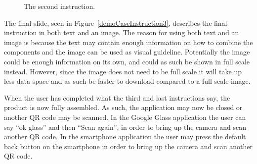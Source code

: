 	\begin{figure}[H]%
		\centering
		\qquad
		\qquad
		\caption{The second instruction.}
		\label{demoCaseInstruction2}
	\end{figure}

The final slide, seen in Figure~\ref{demoCaseInstruction3}, describes the final instruction in both text and an image. The reason for using both text and an image is because the text may contain enough information on how to combine the components and the image can be used as visual guideline. Potentially the image could be enough information on its own, and could as such be shown in full scale instead. However, since the image does not need to be full scale it will take up less data space and as such be faster to download compared to a full scale image.

When the user has completed what the third and last instructions say, the product is now fully assembled. As such, the application may now be closed or another QR code may be scanned. In the Google Glass application the user can say ``ok glass'' and then ``Scan again'', in order to bring up the camera and scan another QR code. In the smartphone application the user may press the default back button on the smartphone in order to bring up the camera and scan another QR code.

